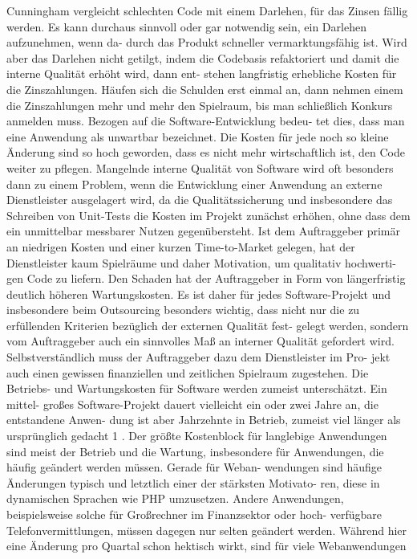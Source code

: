 Cunningham vergleicht schlechten Code mit einem Darlehen, für das Zinsen fällig werden.
Es kann durchaus sinnvoll oder gar notwendig sein, ein Darlehen aufzunehmen, wenn da-
durch das Produkt schneller vermarktungsfähig ist. Wird aber das Darlehen nicht getilgt,
indem die Codebasis refaktoriert und damit die interne Qualität erhöht wird, dann ent-
stehen langfristig erhebliche Kosten für die Zinszahlungen. Häufen sich die Schulden erst
einmal an, dann nehmen einem die Zinszahlungen mehr und mehr den Spielraum, bis
man schließlich Konkurs anmelden muss. Bezogen auf die Software-Entwicklung bedeu-
tet dies, dass man eine Anwendung als unwartbar bezeichnet. Die Kosten für jede noch so
kleine Änderung sind so hoch geworden, dass es nicht mehr wirtschaftlich ist, den Code
weiter zu pflegen.
Mangelnde interne Qualität von Software wird oft besonders dann zu einem Problem,
wenn die Entwicklung einer Anwendung an externe Dienstleister ausgelagert wird, da die
Qualitätssicherung und insbesondere das Schreiben von Unit-Tests die Kosten im Projekt
zunächst erhöhen, ohne dass dem ein unmittelbar messbarer Nutzen gegenübersteht. Ist
dem Auftraggeber primär an niedrigen Kosten und einer kurzen Time-to-Market gelegen,
hat der Dienstleister kaum Spielräume und daher Motivation, um qualitativ hochwerti-
gen Code zu liefern. Den Schaden hat der Auftraggeber in Form von längerfristig deutlich
höheren Wartungskosten.
Es ist daher für jedes Software-Projekt und insbesondere beim Outsourcing besonders
wichtig, dass nicht nur die zu erfüllenden Kriterien bezüglich der externen Qualität fest-
gelegt werden, sondern vom Auftraggeber auch ein sinnvolles Maß an interner Qualität
gefordert wird. Selbstverständlich muss der Auftraggeber dazu dem Dienstleister im Pro-
jekt auch einen gewissen finanziellen und zeitlichen Spielraum zugestehen.
Die Betriebs- und Wartungskosten für Software werden zumeist unterschätzt. Ein mittel-
großes Software-Projekt dauert vielleicht ein oder zwei Jahre an, die entstandene Anwen-
dung ist aber Jahrzehnte in Betrieb, zumeist viel länger als ursprünglich gedacht 1 . Der
größte Kostenblock für langlebige Anwendungen sind meist der Betrieb und die Wartung,
insbesondere für Anwendungen, die häufig geändert werden müssen. Gerade für Weban-
wendungen sind häufige Änderungen typisch und letztlich einer der stärksten Motivato-
ren, diese in dynamischen Sprachen wie PHP umzusetzen.
Andere Anwendungen, beispielsweise solche für Großrechner im Finanzsektor oder hoch-
verfügbare Telefonvermittlungen, müssen dagegen nur selten geändert werden. Während
hier eine Änderung pro Quartal schon hektisch wirkt, sind für viele Webanwendungen
